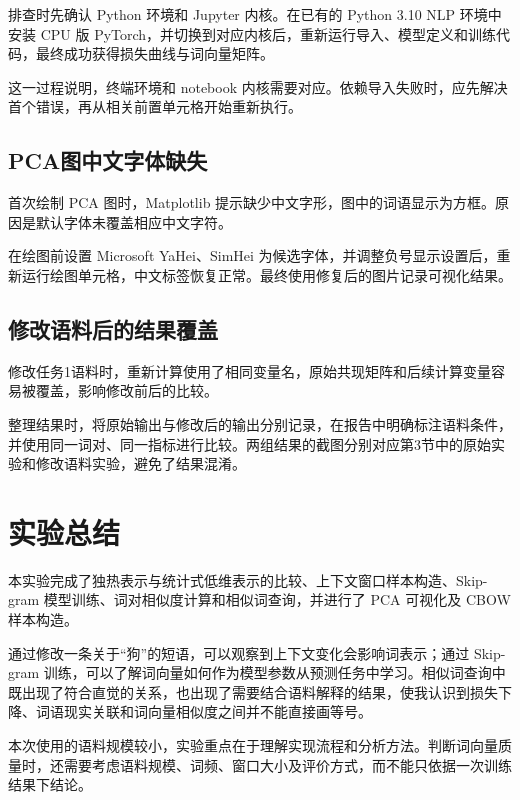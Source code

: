 \documentclass[UTF8,a4paper,zihao=-4,fontset=none]{ctexart}
\begin{document}
排查时先确认 Python 环境和 Jupyter 内核。在已有的 Python 3.10 NLP 环境中安装 CPU 版 PyTorch，并切换到对应内核后，重新运行导入、模型定义和训练代码，最终成功获得损失曲线与词向量矩阵。

这一过程说明，终端环境和 notebook 内核需要对应。依赖导入失败时，应先解决首个错误，再从相关前置单元格开始重新执行。

\subsection{PCA图中文字体缺失}

首次绘制 PCA 图时，Matplotlib 提示缺少中文字形，图中的词语显示为方框。原因是默认字体未覆盖相应中文字符。

在绘图前设置 Microsoft YaHei、SimHei 为候选字体，并调整负号显示设置后，重新运行绘图单元格，中文标签恢复正常。最终使用修复后的图片记录可视化结果。

\subsection{修改语料后的结果覆盖}

修改任务1语料时，重新计算使用了相同变量名，原始共现矩阵和后续计算变量容易被覆盖，影响修改前后的比较。

整理结果时，将原始输出与修改后的输出分别记录，在报告中明确标注语料条件，并使用同一词对、同一指标进行比较。两组结果的截图分别对应第3节中的原始实验和修改语料实验，避免了结果混淆。

\section{实验总结}

本实验完成了独热表示与统计式低维表示的比较、上下文窗口样本构造、Skip-gram 模型训练、词对相似度计算和相似词查询，并进行了 PCA 可视化及 CBOW 样本构造。

通过修改一条关于“狗”的短语，可以观察到上下文变化会影响词表示；通过 Skip-gram 训练，可以了解词向量如何作为模型参数从预测任务中学习。相似词查询中既出现了符合直觉的关系，也出现了需要结合语料解释的结果，使我认识到损失下降、词语现实关联和词向量相似度之间并不能直接画等号。

本次使用的语料规模较小，实验重点在于理解实现流程和分析方法。判断词向量质量时，还需要考虑语料规模、词频、窗口大小及评价方式，而不能只依据一次训练结果下结论。
\end{document}
